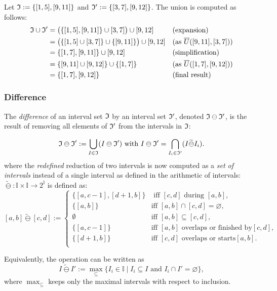 \begin{example} Let $\mathfrak{I} := \{ [1, 5], [9, 11] \}$ and $\mathfrak{I}' := \{ [3, 7], [9, 12] \}$. The union is computed as follows:
    \begin{align*}
    \mathfrak{I} \cup \mathfrak{I}' &= \big(\{ [1, 5], [9, 11] \} \cup [3, 7]\big) \cup [9, 12] && \text{(expansion)}\\
    &= \big( \{ [1, 5] \cup [3, 7] \} \cup \{ [9, 11] \} \big) \cup [9, 12] && (\text{as } \overline{U}([9, 11], [3, 7]))\\
    &= \{ [1, 7], [9, 11] \} \cup [9, 12] && \text{(simplification)}\\
    &= \{ [9, 11] \cup [9, 12] \} \cup \{ [1, 7] \} && (\text{as } \overline{U}([1, 7], [9, 12]))\\
    &= \{ [1, 7], [9, 12] \} && \text{(final result)}
    \end{align*}
    \end{example}

\subsubsection{Difference}\label{differenceop}

The \emph{difference} of an interval set $\mathfrak{I}$ by an interval set $\mathfrak{I}'$, denoted $\mathfrak{I} \ominus \mathfrak{I}'$, is the result of removing all elements of $\mathfrak{I}'$ from the intervals in $\mathfrak{I}$:

$$\mathfrak{I} \ominus \mathfrak{I}' := \bigcup_{I \in \mathfrak{I}}(I \ominus \mathfrak{I}') \text{ with } I \ominus \mathfrak{I'}= \bigcap_{I_i \in \mathfrak{I}'}(I \widetilde{\ominus} I_i).$$
where the \emph{redefined} reduction of two intervals is now computed as a \emph{set of intervals} instead of a single interval as defined in the arithmetic of intervals: $\widetilde{\ominus}: \mathbb{I} \times \mathbb{I} \to 2^\mathbb{I}$ is defined as:
	$$[a,b] \widetilde{\ominus} [c,d] := \begin{cases}
		\{[a,c-1], [d+1,b]\}& \text{ iff   } [c,d] \text{ during } [a,b],\\
		\{[a,b]\} & \text{iff   } [a,b] \cap [c,d]= \varnothing,\\
  \emptyset & \text{iff   } [a,b] \subseteq [c,d],\\
  \{[a,c-1]\} & \text{iff   } [a,b] \text{  overlaps or finished by} [c,d],\\
  \{[d+1,b]\} & \text{iff   } [c,d] \text{ overlaps or starts} [a,b].\\
	\end{cases}$$

\begin{remark}
Equivalently, the operation can be written as
\[
I \widetilde{\ominus} I' :=
\max_{\subseteq}\{ I_i \in \mathbb{I} \mid I_i \subseteq I \text{ and } I_i \cap I' = \varnothing \},
\]
where $\max_{\subseteq}$ keeps only the maximal intervals with respect to inclusion.
\end{remark}

